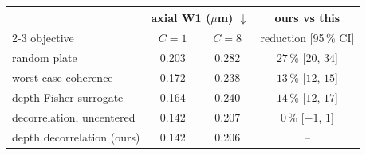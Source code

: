 \begin{tabular}{@{}l cc c@{}}\toprule
& \multicolumn{2}{c}{axial W1 ($\mu$m) $\downarrow$} & ours vs this\\
\cmidrule(lr){2-3}
objective & $C=1$ & $C=8$ & reduction [95\,\% CI]\\\midrule
random plate & 0.203 & 0.282 & $27$\,\% [$20$, $34$]\\
worst-case coherence & 0.172 & 0.238 & $13$\,\% [$12$, $15$]\\
depth-Fisher surrogate & 0.164 & 0.240 & $14$\,\% [$12$, $17$]\\
decorrelation, uncentered & 0.142 & 0.207 & $0$\,\% [$-1$, $1$]\\
depth decorrelation (ours) & 0.142 & 0.206 & --\\
\bottomrule\end{tabular}
